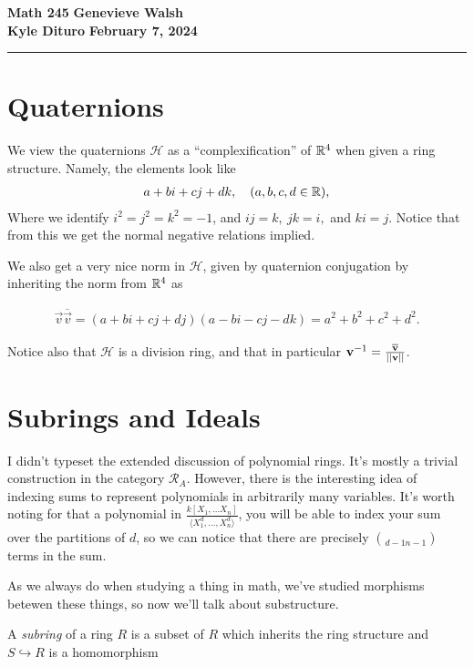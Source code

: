 \documentclass[12pt, twosided]{article}
\begin{document}
\noindent \textbf{Math 245} \hfill \textbf{Genevieve Walsh} \\
\textbf{Kyle Dituro} \hfill \textbf{February 7\tht, 2024}\hrule
\vspace{.2in}

\section{Quaternions}

We view the quaternions \(\mathcal{H}\) as a ``complexification'' of \(\mathbb{R}^4\) when given a ring structure. Namely, the elements look like
\begin{align*}
  a + bi + cj + dk, \quad (a,b,c,d \in \mathbb{R}),
\end{align*}
Where we identify \(i^2 = j^2 = k^2 = -1\), and \( ij = k,\ jk = i,\) and \(ki = j\). Notice that from this we get the normal negative relations implied.

We also get a very nice norm in \(\mathcal{H}\), given by quaternion conjugation by inheriting the norm from \(\mathbb{R}^4\) as

\begin{align*}
  \vec v \overline{\vec v} = (a + bi + cj + dj)(a -bi -cj - dk) = a^2 + b^2 + c^2 + d^2.
\end{align*}

Notice also that \(\mathcal{H}\) is a division ring, and that in particular \(\mathbf{v}^{-1} = \frac{\overline{\mathbf{v}}}{||\mathbf{v}||}\).

\section{Subrings and Ideals}
\begin{note}
  I didn't typeset the extended discussion of polynomial rings. It's mostly a trivial construction in the category \(\mathcal{R}_A\). However, there is the interesting idea of indexing sums to represent polynomials in arbitrarily many variables. It's worth noting for that a polynomial in \(\frac{k[X_1, \ldots X_n]}{\langle X_1^d, \ldots, X_n^d \rangle}\), you will be able to index your sum over the partitions of \(d\), so we can notice that there are precisely \(\choose{d-1}{n-1}\) terms in the sum. 
\end{note}

As we always do when studying a thing in math, we've studied morphisms betewen these things, so now we'll talk about substructure.
\begin{df}
  A \textit{subring} of a ring \(R\) is a subset of \(R\) which inherits the ring structure and \(S \hookrightarrow R\) is a homomorphism
\end{df}
\end{document}
